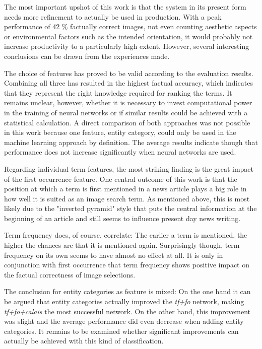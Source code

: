 \documentclass[11pt,a4paper,twoside]{article}
\begin{document}
The most important upshot of this work is that the system in its present form needs more refinement to actually be used in production. With a peak performance of 42 \% factually correct images, not even counting aesthetic aspects or environmental factors such as the intended orientation, it would probably not increase productivity to a particularly high extent. However, several interesting conclusions can be drawn from the experiences made.

The choice of features has proved to be valid according to the evaluation results. Combining all three has resulted in the highest factual accuracy, which indicates that they represent the right knowledge required for ranking the terms. It remains unclear, however, whether it is necessary to invest computational power in the training of neural networks or if similar results could be achieved with a statistical calculation. A direct comparison of both approaches was not possible in this work because one feature, entity category, could only be used in the machine learning approach by definition. The average results indicate though that performance does not increase significantly when neural networks are used.

Regarding individual term features, the most striking finding is the great impact of the first occurrence feature. One central outcome of this work is that the position at which a term is first mentioned in a news article plays a big role in how well it is suited as an image search term. As mentioned above, this is most likely due to the "inverted pyramid" style that puts the central information at the beginning of an article and still seems to influence present day news writing.

Term frequency does, of course, correlate: The earlier a term is mentioned, the higher the chances are that it is mentioned again. Surprisingly though, term frequency on its own seems to have almost no effect at all. It is only in conjunction with first occurrence that term frequency shows positive impact on the factual correctness of image selections.

The conclusion for entity categories as feature is mixed: On the one hand it can be argued that entity categories actually improved the \emph{tf+fo} network, making \emph{tf+fo+calais} the most successful network. On the other hand, this improvement was slight and the average performance did even decrease when adding entity categories. It remains to be examined whether significant improvements can actually be achieved with this kind of classification.
\end{document}

